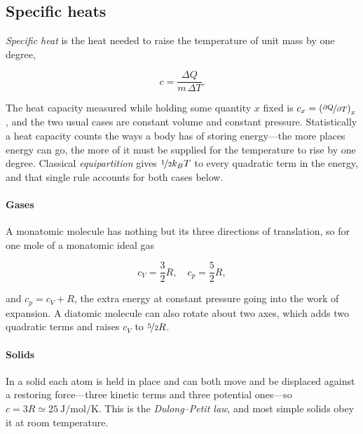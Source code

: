     \subsection{Specific heats}

        \emph{Specific heat} is the heat needed to raise the temperature of unit mass by one degree,

        \begin{equation*}
            c = \frac{\Delta Q}{m\,\Delta T}.
        \end{equation*}

        The heat capacity measured while holding some quantity $x$ fixed is $c_x = \left(\nicefrac{\partial Q}{\partial T}\right)_x$, and the two usual cases are constant volume and constant pressure. Statistically a heat capacity counts the ways a body has of storing energy---the more places energy can go, the more of it must be supplied for the temperature to rise by one degree. Classical \emph{equipartition} gives $\nicefrac{1}{2}k_{B} T$ to every quadratic term in the energy, and that single rule accounts for both cases below.

        \paragraph{Gases}

            A monatomic molecule has nothing but its three directions of translation, so for one mole of a monatomic ideal gas

            \begin{equation*}
                c_{V} = \frac{3}{2}R,\quad  c_{p} = \frac{5}{2}R,
            \end{equation*}

            and $c_p = c_V + R$, the extra energy at constant pressure going into the work of expansion. A diatomic molecule can also rotate about two axes, which adds two quadratic terms and raises $c_V$ to $\nicefrac{5}{2}R$.

        \paragraph{Solids}

            In a solid each atom is held in place and can both move and be displaced against a restoring force---three kinetic terms and three potential ones---so $c = 3R \simeq \qty{25}{\joule\per\mole\per\kelvin}$. This is the \emph{Dulong--Petit law}, and most simple solids obey it at room temperature.


